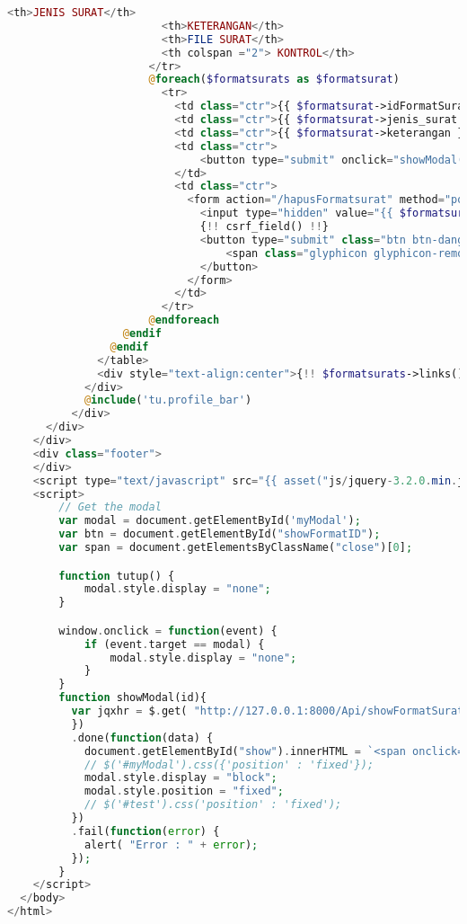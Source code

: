 \begin{lstlisting}[language=php,basicstyle=\tiny,caption=Format surat]
                        <th>JENIS SURAT</th>
                        <th>KETERANGAN</th>
                        <th>FILE SURAT</th>
                        <th colspan ="2"> KONTROL</th>
                      </tr>
                      @foreach($formatsurats as $formatsurat)
                        <tr>
                          <td class="ctr">{{ $formatsurat->idFormatSurat }}</td>
                          <td class="ctr">{{ $formatsurat->jenis_surat }}</td>
                          <td class="ctr">{{ $formatsurat->keterangan }}</td>
                          <td class="ctr">
                              <button type="submit" onclick="showModal({{ $formatsurat->id }})" class="btn btn-link">Klik disini</button>
                          </td>
                          <td class="ctr">
                            <form action="/hapusFormatsurat" method="post">
                              <input type="hidden" value="{{ $formatsurat->id }}" name="deleteID">
                              {!! csrf_field() !!}
                              <button type="submit" class="btn btn-danger" aria-label="Remove" data-toggle="tooltip" title="Remove">
                                  <span class="glyphicon glyphicon-remove" aria-hidden="true"></span>
                              </button>
                            </form>
                          </td>
                        </tr>
                      @endforeach
                  @endif
                @endif
              </table>
              <div style="text-align:center">{!! $formatsurats->links() !!}</div>
            </div>
            @include('tu.profile_bar')
          </div>
      </div>
    </div>
    <div class="footer">
    </div>
    <script type="text/javascript" src="{{ asset("js/jquery-3.2.0.min.js") }}"></script>
    <script>
        // Get the modal
        var modal = document.getElementById('myModal');
        var btn = document.getElementById("showFormatID");
        var span = document.getElementsByClassName("close")[0];

        function tutup() {
            modal.style.display = "none";
        }

        window.onclick = function(event) {
            if (event.target == modal) {
                modal.style.display = "none";
            }
        }
        function showModal(id){
          var jqxhr = $.get( "http://127.0.0.1:8000/Api/showFormatSurat?id=" + id, function() {
          })
          .done(function(data) {
            document.getElementById("show").innerHTML = `<span onclick='tutup()' class='close'>&times;</span>` + data.stringFormat;
            // $('#myModal').css({'position' : 'fixed'});
            modal.style.display = "block";
            modal.style.position = "fixed";
            // $('#test').css('position' : 'fixed');
          })
          .fail(function(error) {
            alert( "Error : " + error);
          });
        }
    </script>
  </body>
</html>

\end{lstlisting}

